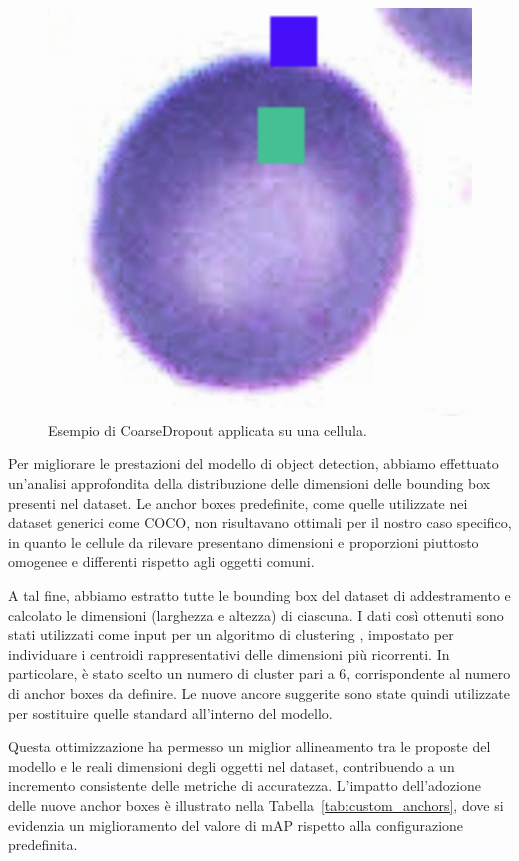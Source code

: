 \documentclass[minted, draw]{../tex/hebdomon}
\newif\ifshowcode
\begin{document}
\ifshowcode
\begin{code}{python}
A.CoarseDropout(
    num_holes_range=(3, 6),              # Numero casuale di buchi tra 3 e 6
    hole_height_range=(10, 20),          # Altezza dei buchi tra 10 e 20 px
    hole_width_range=(10, 20),           # Larghezza dei buchi tra 10 e 20 px
    fill="random_uniform",               # Riempie i buchi con valori casuali
    p=0.2                                # Probabilità di applicazione 20%
)
\end{code}
\fi

\begin{figure}[H]
	\centering
	\includegraphics[width=.2\linewidth]{figures/corse_result.png}
	\caption{Esempio di CoarseDropout applicata su una cellula.}
	\label{fig:coarse_dropout_example}
\end{figure}
%



Per migliorare le prestazioni del modello di object detection, abbiamo effettuato un’analisi approfondita della distribuzione delle dimensioni delle bounding box presenti nel dataset. Le anchor boxes predefinite, come quelle utilizzate nei dataset generici come COCO, non risultavano ottimali per il nostro caso specifico, in quanto le cellule da rilevare presentano dimensioni e proporzioni piuttosto omogenee e differenti rispetto agli oggetti comuni.

A tal fine, abbiamo estratto tutte le bounding box del dataset di addestramento e calcolato le dimensioni (larghezza e altezza) di ciascuna. I dati così ottenuti sono stati utilizzati come input per un algoritmo di clustering , impostato per individuare i centroidi rappresentativi delle dimensioni più ricorrenti. In particolare, è stato scelto un numero di cluster pari a 6, corrispondente al numero di anchor boxes da definire. Le nuove ancore suggerite sono state quindi utilizzate per sostituire quelle standard all’interno del modello.

Questa ottimizzazione ha permesso un miglior allineamento tra le proposte del modello e le reali dimensioni degli oggetti nel dataset, contribuendo a un incremento consistente delle metriche di accuratezza. L'impatto dell’adozione delle nuove anchor boxes è illustrato nella Tabella~\ref{tab:custom_anchors}, dove si evidenzia un miglioramento del valore di mAP rispetto alla configurazione predefinita.
\end{document}
